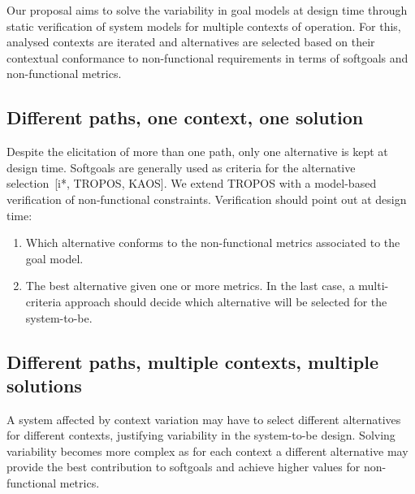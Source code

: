 Our proposal aims to solve the variability in goal models at design time through static verification of system models for multiple contexts of operation. For this, analysed contexts are iterated and alternatives are selected based on their contextual conformance to non-functional requirements in terms of softgoals and non-functional metrics.


\subsection{Different paths, one context, one solution}

Despite the elicitation of more than one path, only one alternative is kept at design time. Softgoals are generally used as criteria for the alternative selection~[i*, TROPOS, KAOS]. We extend TROPOS with a model-based verification of  non-functional constraints. Verification should point out at design time:

\begin{enumerate}

\item Which alternative conforms to the non-functional metrics associated to the goal model. 
\medskip

\item The best alternative given one or more metrics. In the last case, a multi-criteria approach should decide which alternative will be selected for the system-to-be.

\end{enumerate}

\subsection{Different paths, multiple contexts, multiple  solutions}

A system affected by context variation may have to select different alternatives for different contexts, justifying variability in the system-to-be design. Solving variability becomes more complex as for each context a different alternative may provide the best contribution to softgoals and achieve higher values for non-functional metrics. 

